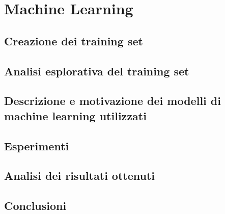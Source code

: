 \setcounter{chapter}{0}
\part{Machine Learning}
\chapter{Creazione dei training set}

\chapter{Analisi esplorativa del training set}

\chapter{Descrizione e motivazione dei modelli di machine learning utilizzati}

\chapter{Esperimenti}

\chapter{Analisi dei risultati ottenuti}

\chapter{Conclusioni}
